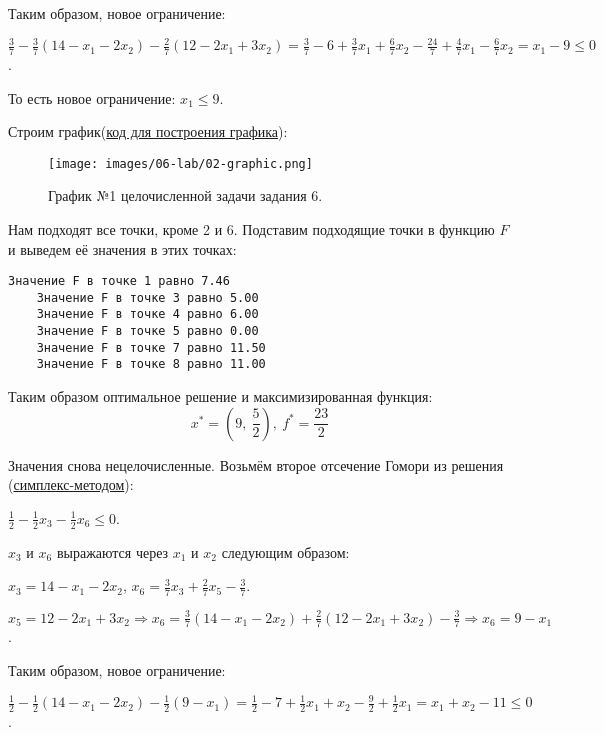 Таким образом, новое ограничение:

$ \frac{ 3}{ 7} - \frac{ 3}{ 7}(14 - x_1 - 2x_2) - \frac{ 2}{ 7}(12 -2x_1 + 3x_2) = \frac{ 3}{ 7} - 6 + \frac{ 3}{ 7}x_1 + \frac{ 6}{ 7} x_2 - \frac{ 24}{ 7} + \frac{ 4}{ 7}x_1 - \frac{ 6}{ 7}x_2 = x_1 - 9 \leq 0 $.

То есть новое ограничение: $x_1 \leq 9$.

Строим график(\href{https://github.com/retrobannerS/optimization_methods/blob/main/python/06-lab/02-graphic.py}{код для построения графика}):

\begin{figure}[H]
    \centering
    \texttt{[image: images/06-lab/02-graphic.png]}
    \caption{График №1 целочисленной задачи задания 6.}
    \label{06-lab-02-graphic}
\end{figure}

Нам подходят все точки, кроме 2 и 6. Подставим подходящие точки в функцию $F$ и выведем её значения в этих точках:

\begin{lstlisting}[language=text]
    Значение F в точке 1 равно 7.46
    Значение F в точке 3 равно 5.00
    Значение F в точке 4 равно 6.00
    Значение F в точке 5 равно 0.00
    Значение F в точке 7 равно 11.50
    Значение F в точке 8 равно 11.00
\end{lstlisting}

Таким образом оптимальное решение и максимизированная функция:
\[x^* = \left(9,\ \dfrac{5}{2}\right),\ f^* = \dfrac{23}{2}\]

Значения снова нецелочисленные. Возьмём второе отсечение Гомори из решения (\hyperref[06-lab-solution-simplex]{симплекс-методом}):

$ \frac{ 1}{ 2} - \frac{ 1}{ 2}x_3 - \frac{ 1}{ 2}x_6 \leq 0 $.

$x_3$ и $x_6$ выражаются через $x_1$ и $x_2$ следующим образом:

$x_3 = 14 - x_1 - 2x_2$, $x_6 = \frac{ 3}{ 7}x_3 + \frac{ 2}{ 7}x_5 - \frac{ 3}{ 7}$.

$x_5 = 12 -2x_1 + 3x_2 \Rightarrow x_6 = \frac{ 3}{ 7}(14 - x_1 - 2x_2) + \frac{ 2}{ 7}(12 -2x_1 + 3x_2) - \frac{ 3}{ 7} \Rightarrow x_6 = 9 - x_1$.

Таким образом, новое ограничение:

$ \frac{ 1}{ 2} - \frac{ 1}{ 2}(14 - x_1 - 2x_2) - \frac{ 1}{ 2}(9 - x_1) = \frac{ 1}{ 2} - 7 + \frac{ 1}{ 2}x_1 + x_2 - \frac{ 9}{ 2} + \frac{ 1}{ 2}x_1 = x_1 + x_2 - 11 \leq 0 $.

